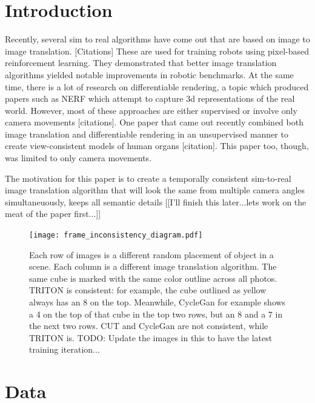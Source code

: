 \documentclass{article}
\begin{document}

\section{Introduction}
	

Recently, several sim to real algorithms have come out that are based on image to image translation. [Citations]
These are used for training robots using pixel-based reinforcement learning.
They demonstrated that better image translation algorithms yielded notable improvements in robotic benchmarks.
At the same time, there is a lot of research on differentiable rendering,
a topic which produced papers such as NERF which attempt to capture 3d representations of the real world.
However, most of these approaches are either supervised or involve only camera movements [citations].
One paper that came out recently combined both image translation and differentiable rendering in an unsupervised manner to create view-consistent models of human organs [citation].
This paper too, though, was limited to only camera movements.

The motivation for this paper is to create a temporally consistent sim-to-real image translation algorithm that will look the same from multiple camera angles simultaneuously, keeps all semantic details 
[[I'll finish this later...lets work on the meat of the paper first...]]

\begin{figure}[H]
	\begin{center}
		\texttt{[image: frame\_inconsistency\_diagram.pdf]}
	\end{center}
	\caption{
		Each row of images is a different random placement of object in a scene.
		Each column is a different image translation algorithm.
		The same cube is marked with the same color outline across all photos.
		TRITON is consistent: for example, the cube outlined as yellow always has an 8 on the top.
		Meanwhile, CycleGan for example shows a 4 on the top of that cube in the top two rows, but an 8 and a 7 in the next two rows.
		CUT and CycleGan are not consistent, while TRITON is.
		TODO: Update the images in this to have the latest training iteration...
		}
	\label{fig:main_diagram}
\end{figure}
		



\section{Data}
\label{sec:data}
\end{document}
